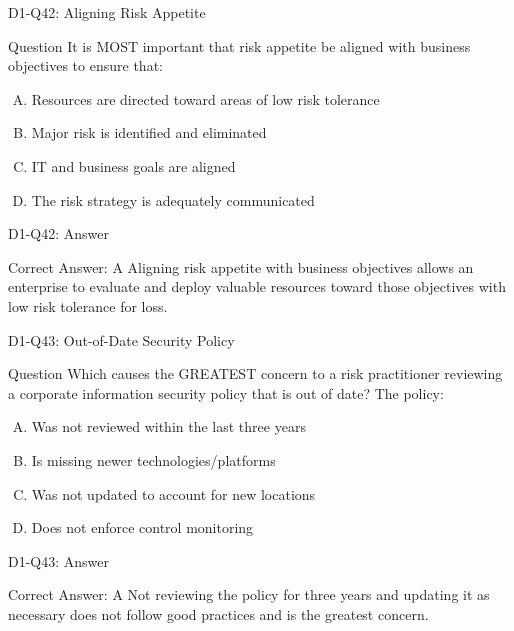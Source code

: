 \documentclass{beamer}
\begin{document}
	\begin{frame}{D1-Q42: Aligning Risk Appetite}
		\begin{block}{Question}
			It is MOST important that risk appetite be aligned with business objectives to ensure that:
		\end{block}
		\begin{enumerate}[(A)]
			\item Resources are directed toward areas of low risk tolerance
			\item Major risk is identified and eliminated
			\item IT and business goals are aligned
			\item The risk strategy is adequately communicated
		\end{enumerate}
	\end{frame}
	\begin{frame}{D1-Q42: Answer}
		\begin{block}{Correct Answer: A}
			Aligning risk appetite with business objectives allows an enterprise to evaluate and deploy valuable resources toward those objectives with low risk tolerance for loss.
		\end{block}
	\end{frame}
	
	\begin{frame}{D1-Q43: Out-of-Date Security Policy}
		\begin{block}{Question}
			Which causes the GREATEST concern to a risk practitioner reviewing a corporate information security policy that is out of date? The policy:
		\end{block}
		\begin{enumerate}[(A)]
			\item Was not reviewed within the last three years
			\item Is missing newer technologies/platforms
			\item Was not updated to account for new locations
			\item Does not enforce control monitoring
		\end{enumerate}
	\end{frame}
	\begin{frame}{D1-Q43: Answer}
		\begin{block}{Correct Answer: A}
			Not reviewing the policy for three years and updating it as necessary does not follow good practices and is the greatest concern.
		\end{block}
	\end{frame}
	
\end{document}

